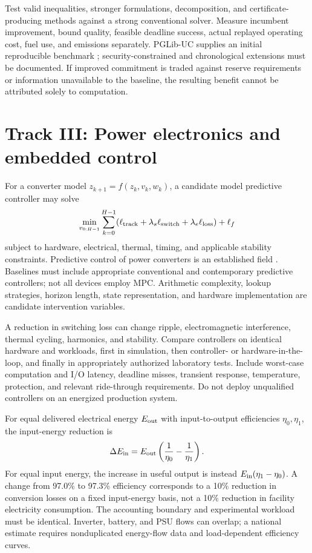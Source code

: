 \documentclass[11pt,letterpaper]{article}
\begin{document}
Test valid inequalities, stronger formulations, decomposition, and certificate-producing methods against a strong conventional solver. Measure incumbent improvement, bound quality, feasible deadline success, actual replayed operating cost, fuel use, and emissions separately. PGLib-UC supplies an initial reproducible benchmark \cite{pglibuc}; security-constrained and chronological extensions must be documented. If improved commitment is traded against reserve requirements or information unavailable to the baseline, the resulting benefit cannot be attributed solely to computation.

\section{Track III: Power electronics and embedded control}
For a converter model $z_{k+1}=f(z_k,v_k,w_k)$, a candidate model predictive controller may solve
\begin{equation}
\min_{v_{0:H-1}}\sum_{k=0}^{H-1}
(\ell_{\rm track}+\lambda_s\ell_{\rm switch}+\lambda_e\ell_{\rm loss})+\ell_f
\end{equation}
subject to hardware, electrical, thermal, timing, and applicable stability constraints. Predictive control of power converters is an established field \cite{mpc}. Baselines must include appropriate conventional and contemporary predictive controllers; not all devices employ MPC. Arithmetic complexity, lookup strategies, horizon length, state representation, and hardware implementation are candidate intervention variables.

A reduction in switching loss can change ripple, electromagnetic interference, thermal cycling, harmonics, and stability. Compare controllers on identical hardware and workloads, first in simulation, then controller- or hardware-in-the-loop, and finally in appropriately authorized laboratory tests. Include worst-case computation and I/O latency, deadline misses, transient response, temperature, protection, and relevant ride-through requirements. Do not deploy unqualified controllers on an energized production system.

For equal delivered electrical energy $E_{\rm out}$ with input-to-output efficiencies $\eta_0,\eta_1$, the input-energy reduction is
\begin{equation}
\Delta E_{\rm in}=E_{\rm out}\left(\frac{1}{\eta_0}-\frac{1}{\eta_1}\right).
\end{equation}
For equal input energy, the increase in useful output is instead $E_{\rm in}(\eta_1-\eta_0)$. A change from 97.0\% to 97.3\% efficiency corresponds to a 10\% reduction in conversion losses on a fixed input-energy basis, not a 10\% reduction in facility electricity consumption. The accounting boundary and experimental workload must be identical. Inverter, battery, and PSU flows can overlap; a national estimate requires nonduplicated energy-flow data and load-dependent efficiency curves.
\end{document}

